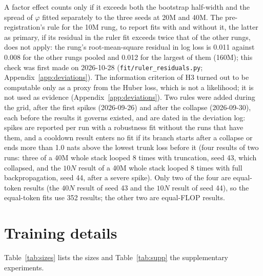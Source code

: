 A factor effect counts only if it exceeds both the bootstrap half-width and the spread of $\varphi$ fitted separately
to the three seeds at 20M and 40M. The pre-registration's rule for the 10M rung, to report fits with and without it, the
latter as primary, if its residual in the ruler fit exceeds twice that of the other rungs, does not apply: the rung's
root-mean-square residual in log loss is 0.011 against 0.008 for the other rungs pooled and 0.012 for the largest of
them (160M); this check was first made on 2026-10-28 (\texttt{fit/ruler\_residuals.py}; Appendix~\ref{app:deviations}). The information criterion of H3 turned out to be computable only as a proxy from the
Huber loss, which is not a likelihood; it is not used as evidence (Appendix~\ref{app:deviations}). Two rules were added
during the grid, after the first spikes (2026-09-26) and after the collapse (2026-09-30), each before the results it
governs existed, and are dated in the deviation log: spikes are reported per run with a robustness fit without the runs that have them, and a cooldown result enters no fit
if its branch starts after a collapse or ends more than 1.0 nats above the lowest trunk loss before it (four results of
two runs: three of a 40M whole stack looped 8 times with truncation, seed 43, which collapsed, and the $10N$ result of a
40M whole stack looped 8 times with full backpropagation, seed 44, after a severe spike). Only two of the four are
equal-token results (the $40N$ result of seed 43 and the $10N$ result of seed 44), so the equal-token fits use 352
results; the other two are equal-FLOP results.

\section{Training details}
\label{app:training}

Table~\ref{tab:sizes} lists the sizes and Table~\ref{tab:supp} the supplementary experiments.

